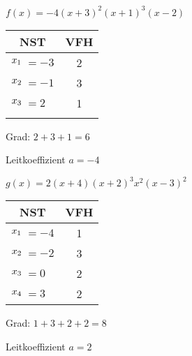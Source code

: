 \begin{minipage}{\textwidth}
\begin{minipage}{0.5\textwidth}\centering
	\(f(x)=-4\left(x+3\right)^2\left(x+1\right)^3\left(x-2\right)\)

	\begin{tabular}{rlc}
		\multicolumn{2}{c}{NST}&VFH\\
		\midrule
		\(x_1\hspace{-0.3cm}\)&\(=-3\)&2\\
		\(x_2\hspace{-0.3cm}\)&\(=-1\)&3\\
		\(x_3\hspace{-0.3cm}\)&\(=2\)&1\\
		\phantom{\(x_3\)}&\phantom{\(=2\)}&\phantom{1}
	\end{tabular}%

	Grad: \(2+3+1=6\)

	Leitkoeffizient \(a=-4\)
\end{minipage}%
\begin{minipage}{0.5\textwidth}\centering
	\(g(x)=2\left(x+4\right)\left(x+2\right)^3x^2\left(x-3\right)^2\)

	\begin{tabular}{rlc}
		\multicolumn{2}{c}{NST}&VFH\\
		\midrule
		\(x_1\hspace{-0.3cm}\)&\(=-4\)&1\\
		\(x_2\hspace{-0.3cm}\)&\(=-2\)&3\\
		\(x_3\hspace{-0.3cm}\)&\(=0\)&2\\
		\(x_4\hspace{-0.3cm}\)&\(=3\)&2
	\end{tabular}%

	Grad: \(1+3+2+2=8\)

	Leitkoeffizient \(a=2\)
\end{minipage}%
\end{minipage}

\vspace{1cm}


